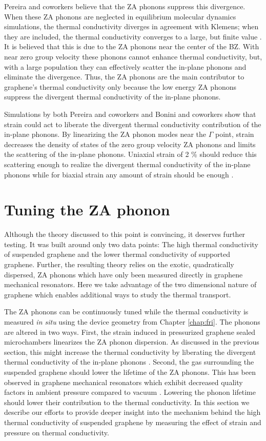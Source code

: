Pereira and coworkers believe that the ZA phonons suppress this divergence.
When these ZA phonons are neglected in equilibrium molecular dynamics simulations, the thermal conductivity diverges in agreement with Klemens; when they are included, the thermal conductivity converges to a large, but finite value \cite{Pereira2013}.
It is believed that this is due to the ZA phonons near the center of the BZ.
With near zero group velocity these phonons cannot enhance thermal conductivity, but, with a large population they can effectively scatter the in-plane phonons and eliminate the divergence.
Thus, the ZA phonons are the main contributor to graphene's thermal conductivity only because the low energy ZA phonons suppress the divergent thermal conductivity of the in-plane phonons.

Simulations by both Pereira \cite{Pereira2013} and coworkers and Bonini and coworkers \cite{Bonini2012} show that strain could act to liberate the divergent thermal conductivity contribution of the in-plane phonons.
By linearizing the ZA phonon modes near the $\Gamma$ point, strain decreases the density of states of the zero group velocity ZA phonons and limits the scattering of the in-plane phonons.
Uniaxial strain of 2 \% should reduce this scattering enough to realize the divergent thermal conductivity of the in-plane phonons \cite{Pereira2013} while for biaxial strain any amount of strain should be enough \cite{Bonini2012}.

\section{Tuning the ZA phonon}
Although the theory discussed to this point is convincing, it deserves further testing.
It was built around only two data points: The high thermal conductivity of suspended graphene and the lower thermal conductivity of supported graphene.
Further, the resulting theory relies on the exotic, quadratically dispersed, ZA phonons which have only been measured directly in graphene mechanical resonators.
Here we take advantage of the two dimensional nature of graphene which enables additional ways to study the thermal transport.

The ZA phonons can be continuously tuned while the thermal conductivity is measured \textit{in situ} using the device geometry from Chapter \ref{chap:fri}.
The phonons are altered in two ways.
First, the strain induced in pressurized graphene sealed microchambers linearizes the ZA phonon dispersion.
As discussed in the previous section, this might increase the thermal conductivity by liberating the divergent thermal conductivity of the in-plane phonons \cite{Pereira2013,Bonini2012}.
Second, the gas surrounding the suspended graphene should lower the lifetime of the ZA phonons.
This has been observed in graphene mechanical resonators which exhibit decreased quality factors in ambient pressure compared to vacuum \cite{Bunch2007}.
Lowering the phonon lifetime should lower their contribution to the thermal conductivity.
In this section we describe our efforts to provide deeper insight into the mechanism behind the high thermal conductivity of suspended graphene by measuring the effect of strain and pressure on thermal conductivity.

